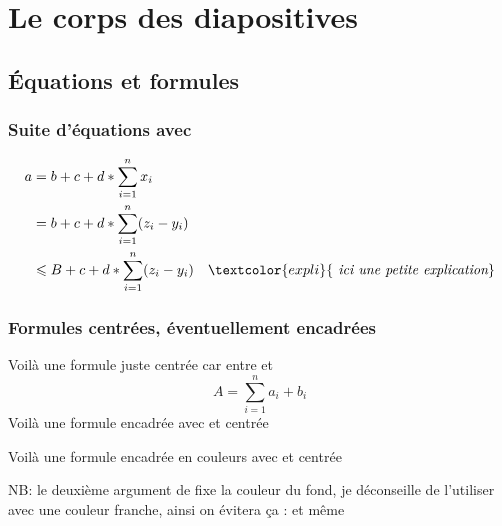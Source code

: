 \section{Le corps des diapositives}

\subsection{Équations et formules}
\begin{frame}
	\frametitle{Suite d'équations avec }
	\begin{align*}
		a 
		& = b+c+d * \sum_{i=1}^n x_i\\
		& = b+c+d * \sum_{i=1}^n (z_i - y_i)\\
		& \leqslant B+c+d * \sum_{i=1}^n (z_i - y_i) & 
		\textcolor{expli}{\textit{ ici une petite explication}}\\
	\end{align*}
\end{frame}

\begin{frame}
	\frametitle{Formules centrées, éventuellement encadrées\esp}
	Voilà une formule juste centrée car entre \lin{$$} et \lin{$$} 
	$$ A  = \sum_{i=1}^{n} a_i +b_i$$
	Voilà une formule encadrée avec \lin{\fbox} et centrée 
	\begin{center}
	\end{center}
	
	Voilà une formule encadrée en couleurs avec \lin{\fcolorbox} et centrée
	\begin{center}
	\end{center}
	NB: le deuxième argument de \lin{\fcolorbox} fixe la couleur du fond, je déconseille de l'utiliser avec une couleur franche, ainsi on évitera ça : 
	et même
\end{frame}


